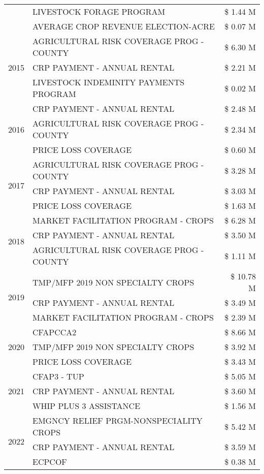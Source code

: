 \begin{tabular}{llr}
 & LIVESTOCK FORAGE PROGRAM & \$ 1.44 M \\
 & AVERAGE CROP REVENUE ELECTION-ACRE & \$ 0.07 M \\
\cline{1-3}
\multirow[t]{3}{*}{2015} & AGRICULTURAL RISK COVERAGE PROG - COUNTY & \$ 6.30 M \\
 & CRP PAYMENT - ANNUAL RENTAL & \$ 2.21 M \\
 & LIVESTOCK INDEMINITY PAYMENTS PROGRAM & \$ 0.02 M \\
\cline{1-3}
\multirow[t]{3}{*}{2016} & CRP PAYMENT - ANNUAL RENTAL & \$ 2.48 M \\
 & AGRICULTURAL RISK COVERAGE PROG - COUNTY & \$ 2.34 M \\
 & PRICE LOSS COVERAGE & \$ 0.60 M \\
\cline{1-3}
\multirow[t]{3}{*}{2017} & AGRICULTURAL RISK COVERAGE PROG - COUNTY & \$ 3.28 M \\
 & CRP PAYMENT - ANNUAL RENTAL & \$ 3.03 M \\
 & PRICE LOSS COVERAGE & \$ 1.63 M \\
\cline{1-3}
\multirow[t]{3}{*}{2018} & MARKET FACILITATION PROGRAM - CROPS & \$ 6.28 M \\
 & CRP PAYMENT - ANNUAL RENTAL & \$ 3.50 M \\
 & AGRICULTURAL RISK COVERAGE PROG - COUNTY & \$ 1.11 M \\
\cline{1-3}
\multirow[t]{3}{*}{2019} & TMP/MFP 2019 NON SPECIALTY CROPS & \$ 10.78 M \\
 & CRP PAYMENT - ANNUAL RENTAL & \$ 3.49 M \\
 & MARKET FACILITATION PROGRAM - CROPS & \$ 2.39 M \\
\cline{1-3}
\multirow[t]{3}{*}{2020} & CFAPCCA2 & \$ 8.66 M \\
 & TMP/MFP 2019 NON SPECIALTY CROPS & \$ 3.92 M \\
 & PRICE LOSS COVERAGE & \$ 3.43 M \\
\cline{1-3}
\multirow[t]{3}{*}{2021} & CFAP3 - TUP & \$ 5.05 M \\
 & CRP PAYMENT - ANNUAL RENTAL & \$ 3.60 M \\
 & WHIP PLUS 3 ASSISTANCE & \$ 1.56 M \\
\cline{1-3}
\multirow[t]{3}{*}{2022} & EMGNCY RELIEF PRGM-NONSPECIALITY CROPS & \$ 5.42 M \\
 & CRP PAYMENT - ANNUAL RENTAL & \$ 3.59 M \\
 & ECPCOF & \$ 0.38 M \\
\cline{1-3}
\bottomrule
\end{tabular}
